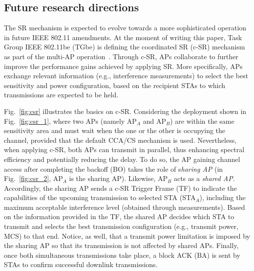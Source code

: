 \documentclass[10pt,a4paper,twocolumn]{article}
\newcommand{\ITUurl}[1]{\textcolor{blue}{\urlstyle{same}\url{#1}}}
\newcommand{\ITUpar}{\vspace{8pt}\par}
\newcommand{\ITUfootnote}[1]{\footnote{#1}}
\begin{document}




\subsection{Future research directions}

The SR mechanism is expected to evolve towards a more sophisticated operation in future IEEE 802.11 amendments. At the moment of writing this paper, Task Group IEEE 802.11be (TGbe) is defining the coordinated SR (c-SR) mechanism as part of the multi-AP operation~\cite{nunez2021txop}. Through c-SR, APs collaborate to further improve the performance gains achieved by applying SR. More specifically, APs exchange relevant information (e.g., interference measurements) to select the best sensitivity and power configuration, based on the recipient STAs to which transmissions are expected to be held.\ITUpar

Fig.~\ref{fig:csr} illustrates the basics on c-SR. Considering the deployment shown in Fig.~\ref{fig:csr_1}, where two APs (namely AP$_A$ and AP$_B$) are within the same sensitivity area and must wait when the one or the other is occupying the channel, provided that the default CCA/CS mechanism is used. Nevertheless, when applying c-SR, both APs can transmit in parallel, thus enhancing spectral efficiency and potentially reducing the delay. To do so, the AP gaining channel access after completing the backoff (BO) takes the role of s\textit{haring AP} (in Fig.~\ref{fig:csr_2}, AP$_A$ is the sharing AP). Likewise, AP$_B$ acts as a \textit{shared AP}. Accordingly, the sharing AP sends a c-SR Trigger Frame (TF) to indicate the capabilities of the upcoming transmission to selected STA (STA$_A$), including the maximum acceptable interference level (obtained through measurements). Based on the information provided in the TF, the shared AP decides which STA to transmit and selects the best transmission configuration (e.g., transmit power, MCS) to that end. Notice, as well, that a transmit power limitation is imposed by the sharing AP so that its transmission is not affected by shared APs. Finally, once both simultaneous transmissions take place, a block ACK (BA) is sent by STAs to confirm successful downlink transmissions.\ITUpar
\end{document}

